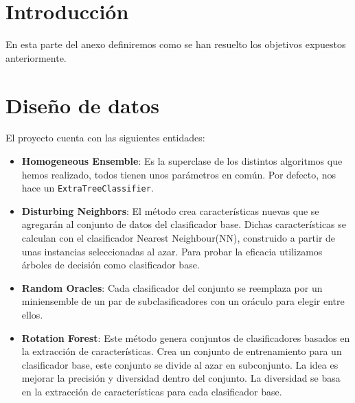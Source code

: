 
\section{Introducción}
En esta parte del anexo definiremos como se han resuelto los objetivos expuestos anteriormente.
\section{Diseño de datos}
El proyecto cuenta con las siguientes entidades:
\begin{itemize}
	\item \textbf{Homogeneous Ensemble}: Es la superclase de los distintos algoritmos que hemos realizado, todos tienen unos parámetros en común. Por defecto, nos hace un \texttt{ExtraTreeClassifier}.
	\item \textbf{Disturbing Neighbors}: El método crea características nuevas que se agregarán al conjunto de datos del clasificador base. Dichas características se calculan con el clasificador Nearest Neighbour(NN), construido a partir de unas instancias seleccionadas al azar. Para probar la eficacia utilizamos árboles de decisión como clasificador base. 
	\item \textbf{Random Oracles}: Cada clasificador del conjunto se reemplaza por un miniensemble de un par de subclasificadores con un oráculo para elegir entre ellos.
	\item \textbf{Rotation Forest}: Este método genera conjuntos de clasificadores basados en la extracción de características. Crea un conjunto de entrenamiento para un clasificador base, este conjunto se divide al azar en subconjunto. La idea es mejorar la precisión y diversidad dentro del conjunto. La diversidad se basa en la extracción de características para cada clasificador base.
\end{itemize}



